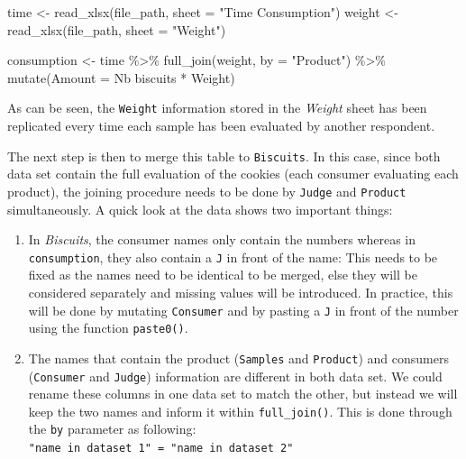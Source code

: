 \documentclass[
]{krantz}
\makeatletter
\newenvironment{Shaded}{\begin{snugshade}}{\end{snugshade}}
\newcommand{\AttributeTok}[1]{\textcolor[rgb]{0.61,0.61,0.61}{#1}}
\newcommand{\FunctionTok}[1]{\textcolor[rgb]{0,0,0}{#1}}
\newcommand{\NormalTok}[1]{#1}
\newcommand{\OtherTok}[1]{\textcolor[rgb]{0.37,0.37,0.37}{#1}}
\newcommand{\SpecialCharTok}[1]{\textcolor[rgb]{0,0,0}{#1}}
\newcommand{\StringTok}[1]{\textcolor[rgb]{0.5,0.5,0.5}{#1}}
\providecommand{\tightlist}{%
  \setlength{\itemsep}{0pt}\setlength{\parskip}{0pt}}
\newenvironment{kframe}{%
\medskip{}
\setlength{\fboxsep}{.8em}
 \def\at@end@of@kframe{}%
 \ifinner\ifhmode%
  \def\at@end@of@kframe{\end{minipage}}%
  \begin{minipage}{\columnwidth}%
 \fi\fi%
 \def\FrameCommand##1{\hskip\@totalleftmargin \hskip-\fboxsep
 \colorbox{shadecolor}{##1}\hskip-\fboxsep
     \hskip-\linewidth \hskip-\@totalleftmargin \hskip\columnwidth}%
 \MakeFramed {\advance\hsize-\width
   \@totalleftmargin\z@ \linewidth\hsize
   \@setminipage}}%
 {\par\unskip\endMakeFramed%
 \at@end@of@kframe}
\renewenvironment{Shaded}{\begin{kframe}}{\end{kframe}}
\makeatother
\begin{document}
\begin{Shaded}
\begin{Highlighting}[]
\NormalTok{time }\OtherTok{\textless{}{-}} \FunctionTok{read\_xlsx}\NormalTok{(file\_path, }\AttributeTok{sheet =} \StringTok{"Time Consumption"}\NormalTok{)}
\NormalTok{weight }\OtherTok{\textless{}{-}} \FunctionTok{read\_xlsx}\NormalTok{(file\_path, }\AttributeTok{sheet =} \StringTok{"Weight"}\NormalTok{)}

\NormalTok{consumption }\OtherTok{\textless{}{-}}\NormalTok{ time }\SpecialCharTok{\%\textgreater{}\%}
    \FunctionTok{full\_join}\NormalTok{(weight, }\AttributeTok{by =} \StringTok{"Product"}\NormalTok{) }\SpecialCharTok{\%\textgreater{}\%}
    \FunctionTok{mutate}\NormalTok{(}\AttributeTok{Amount =} \StringTok{\textasciigrave{}}\AttributeTok{Nb biscuits}\StringTok{\textasciigrave{}} \SpecialCharTok{*}\NormalTok{ Weight)}
\end{Highlighting}
\end{Shaded}

As can be seen, the \texttt{Weight} information stored in the \emph{Weight} sheet has been replicated every time each sample has been evaluated by another respondent.

The next step is then to merge this table to \texttt{Biscuits}. In this case, since both data set contain the full evaluation of the cookies (each consumer evaluating each product), the joining procedure needs to be done by \texttt{Judge} and \texttt{Product} simultaneously. A quick look at the data shows two important things:

\begin{enumerate}
\def\labelenumi{\arabic{enumi}.}
\tightlist
\item
  In \emph{Biscuits}, the consumer names only contain the numbers whereas in \texttt{consumption}, they also contain a \texttt{J} in front of the name: This needs to be fixed as the names need to be identical to be merged, else they will be considered separately and missing values will be introduced. In practice, this will be done by mutating \texttt{Consumer} and by pasting a \texttt{J} in front of the number using the function \texttt{paste0()}.
\item
  The names that contain the product (\texttt{Samples} and \texttt{Product}) and consumers (\texttt{Consumer} and \texttt{Judge}) information are different in both data set. We could rename these columns in one data set to match the other, but instead we will keep the two names and inform it within \texttt{full\_join()}. This is done through the \texttt{by} parameter as following: \texttt{"name\ in\ dataset\ 1"\ =\ "name\ in\ dataset\ 2"}
\end{enumerate}
\end{document}
